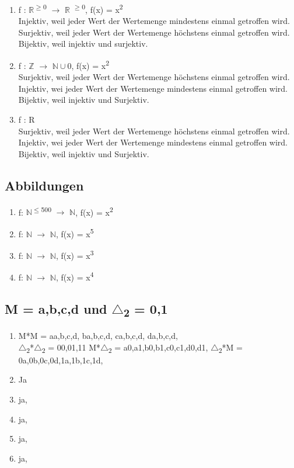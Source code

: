 \begin{enumerate}
{        wird. Nicht Bijektiv, weil nicht Injektiv und Surjektiv.
    }
    \item f : $\mathbb{R}$\textsuperscript{$\geq$0} $\to$ $\mathbb{R}$
    \textsuperscript{$\geq$0}, f(x) = x\textsuperscript{2}\\
    {
        \tiny
        Injektiv, weil jeder Wert der Wertemenge mindestens einmal getroffen
        wird. Surjektiv, weil jeder Wert der Wertemenge höchstens einmal
        getroffen wird. Bijektiv, weil injektiv und surjektiv.
    }
    \item f : $\mathbb{Z}$ $\to$ $\mathbb{N}\cup${0}, f(x) = x\textsuperscript{2}\\
    {
        \tiny
        Surjektiv, weil jeder Wert der Wertemenge höchstens einmal getroffen
        wird. Injektiv, wei jeder Wert der Wertemenge mindestens einmal
        getroffen wird. Bijektiv, weil injektiv und Surjektiv.
    }
    \item f : R\\
    {
        \tiny
        Surjektiv, weil jeder Wert der Wertemenge höchstens einmal getroffen
        wird. Injektiv, wei jeder Wert der Wertemenge mindestens einmal
        getroffen wird. Bijektiv, weil injektiv und Surjektiv.
    }
\end{enumerate}
\subsection{Abbildungen}
\begin{enumerate}
    \item f: $\mathbb{N}$\textsuperscript{$\leq$500} $\to$ $\mathbb{N}$, 
    f(x) = x\textsuperscript{2}\\
    \item f: $\mathbb{N}$ $\to$ $\mathbb{N}$, f(x) = x\textsuperscript{5}
    \item f: $\mathbb{N}$ $\to$ $\mathbb{N}$, f(x) = x\textsuperscript{3}
    \item f: $\mathbb{N}$ $\to$ $\mathbb{N}$, f(x) = x\textsuperscript{4}
\end{enumerate}
\subsection{M = {a,b,c,d} und $\triangle$\textsubscript{2} = {0,1}}
\begin{enumerate}
    \item M*M = {
        a{a,b,c,d},
        b{a,b,c,d},
        c{a,b,c,d},
        d{a,b,c,d},
    }\\ $\triangle$\textsubscript{2}*$\triangle$\textsubscript{2} ={
        00,01,11
    } M*$\triangle$\textsubscript{2} ={
        a0,a1,b0,b1,c0,c1,d0,d1,
    } $\triangle$\textsubscript{2}*M ={
        0a,0b,0c,0d,1a,1b,1c,1d,
    }
    \item Ja
        \item ja,
        \item ja,
        \item ja,
        \item ja,
\end{enumerate}
